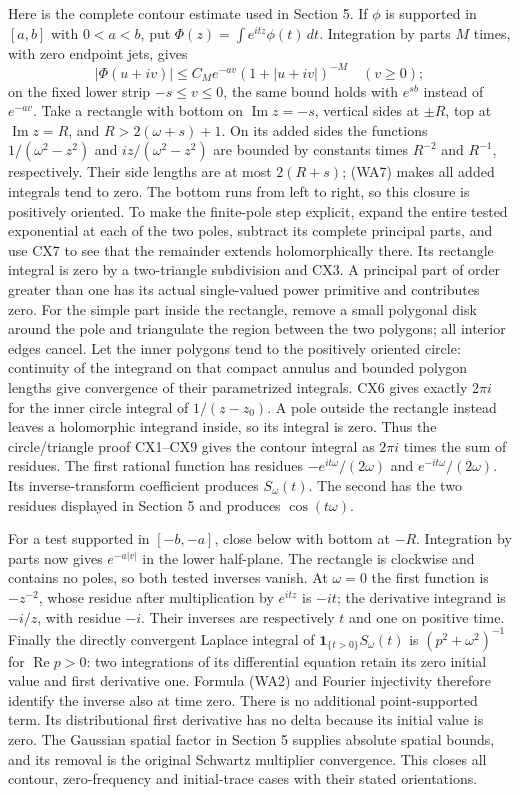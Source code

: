 \documentclass[
  11pt,
]{article}
\begin{document}
Here is the complete contour estimate used in Section 5. If \(\phi\) is
supported in \([a,b]\) with \(0<a<b\), put
\(\Phi(z)=\int e^{itz}\phi(t)\,dt\). Integration by parts \(M\) times,
with zero endpoint jets, gives \[
 |\Phi(u+iv)|\leq C_M e^{-av}(1+|u+iv|)^{-M}\quad(v\geq0);
 \tag{WA7}
\] on the fixed lower strip \(-s\leq v\leq0\), the same bound holds with
\(e^{sb}\) instead of \(e^{-av}\). Take a rectangle with bottom on
\(\operatorname{Im}z=-s\), vertical sides at \(\pm R\), top at
\(\operatorname{Im}z=R\), and \(R>2(\omega+s)+1\). On its added sides
the functions \(1/(\omega^2-z^2)\) and \(iz/(\omega^2-z^2)\) are bounded
by constants times \(R^{-2}\) and \(R^{-1}\), respectively. Their side
lengths are at most \(2(R+s)\); (WA7) makes all added integrals tend to
zero. The bottom runs from left to right, so this closure is positively
oriented. To make the finite-pole step explicit, expand the entire
tested exponential at each of the two poles, subtract its complete
principal parts, and use CX7 to see that the remainder extends
holomorphically there. Its rectangle integral is zero by a two-triangle
subdivision and CX3. A principal part of order greater than one has its
actual single-valued power primitive and contributes zero. For the
simple part inside the rectangle, remove a small polygonal disk around
the pole and triangulate the region between the two polygons; all
interior edges cancel. Let the inner polygons tend to the positively
oriented circle: continuity of the integrand on that compact annulus and
bounded polygon lengths give convergence of their parametrized
integrals. CX6 gives exactly \(2\pi i\) for the inner circle integral of
\(1/(z-z_0)\). A pole outside the rectangle instead leaves a holomorphic
integrand inside, so its integral is zero. Thus the circle/triangle
proof CX1--CX9 gives the contour integral as \(2\pi i\) times the sum of
residues. The first rational function has residues
\(-e^{it\omega}/(2\omega)\) and \(e^{-it\omega}/(2\omega)\). Its
inverse-transform coefficient produces \(S_\omega(t)\). The second has
the two residues displayed in Section 5 and produces \(\cos(t\omega)\).

For a test supported in \([-b,-a]\), close below with bottom at \(-R\).
Integration by parts now gives \(e^{-a|v|}\) in the lower half-plane.
The rectangle is clockwise and contains no poles, so both tested
inverses vanish. At \(\omega=0\) the first function is \(-z^{-2}\),
whose residue after multiplication by \(e^{itz}\) is \(-it\); the
derivative integrand is \(-i/z\), with residue \(-i\). Their inverses
are respectively \(t\) and one on positive time. Finally the directly
convergent Laplace integral of \(\boldsymbol1_{\{t>0\}}S_\omega(t)\) is
\((p^2+\omega^2)^{-1}\) for \(\operatorname{Re}p>0\): two integrations
of its differential equation retain its zero initial value and first
derivative one. Formula (WA2) and Fourier injectivity therefore identify
the inverse also at time zero. There is no additional point-supported
term. Its distributional first derivative has no delta because its
initial value is zero. The Gaussian spatial factor in Section 5 supplies
absolute spatial bounds, and its removal is the original Schwartz
multiplier convergence. This closes all contour, zero-frequency and
initial-trace cases with their stated orientations.
\end{document}
